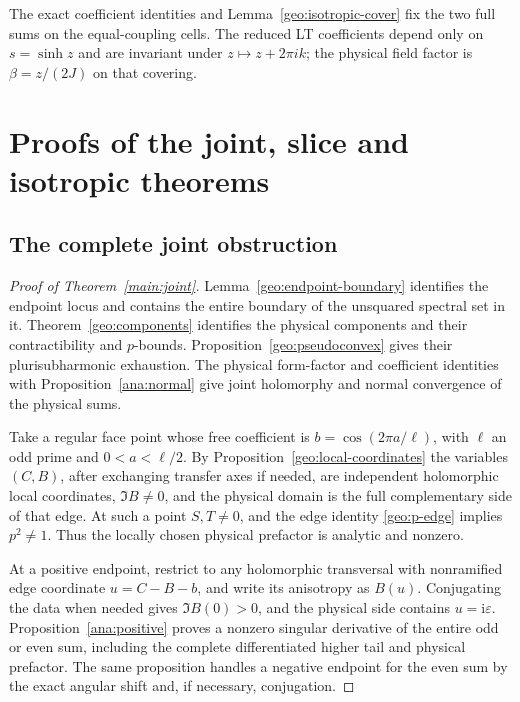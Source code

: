 \documentclass[11pt]{article}
\numberwithin{equation}{section}
\theoremstyle{definition}
\newcommand{\ii}{\mathrm i}
\newcommand{\eps}{\varepsilon}
\begin{document}
The exact coefficient identities and Lemma~\ref{geo:isotropic-cover}
fix the two full sums on the equal-coupling cells. The reduced LT
coefficients depend only on $s=\sinh z$ and are invariant under
$z\mapsto z+2\pi i k$; the physical field factor is $\beta=z/(2J)$
on that covering.

\section{Proofs of the joint, slice and isotropic theorems}
\label{main:closure}

\subsection{The complete joint obstruction}

\begin{proof}[Proof of Theorem~\ref{main:joint}]
Lemma~\ref{geo:endpoint-boundary} identifies the endpoint locus and
contains the entire boundary of the unsquared spectral set in it.
Theorem~\ref{geo:components} identifies the physical components
and their contractibility and \(p\)-bounds.
Proposition~\ref{geo:pseudoconvex} gives their plurisubharmonic
exhaustion. The physical form-factor and coefficient identities with
Proposition~\ref{ana:normal} give joint holomorphy and normal
convergence of the physical sums.

Take a regular face point whose free coefficient is
\(b=\cos(2\pi a/\ell)\), with \(\ell\) an odd prime and
\(0<a<\ell/2\). By Proposition~\ref{geo:local-coordinates} the
variables \((C,B)\), after exchanging transfer axes if needed,
are independent holomorphic local coordinates, \(\Im B\ne0\),
and the physical domain is the full complementary side of that edge.
At such a point \(S,T\ne0\), and the edge identity
\eqref{geo:p-edge} implies \(p^2\ne1\). Thus the locally chosen
physical prefactor is analytic and nonzero.

At a positive endpoint, restrict to any holomorphic transversal with
nonramified edge coordinate \(u=C-B-b\), and write its anisotropy
as \(B(u)\). Conjugating the data when
needed gives \(\Im B(0)>0\), and the physical side contains
\(u=\ii\eps\). Proposition~\ref{ana:positive} proves a nonzero
singular derivative of the entire odd or even sum, including the
complete differentiated higher tail and physical prefactor. The
same proposition handles a negative endpoint for the even sum by
the exact angular shift and, if necessary, conjugation.


\end{proof}
\end{document}
